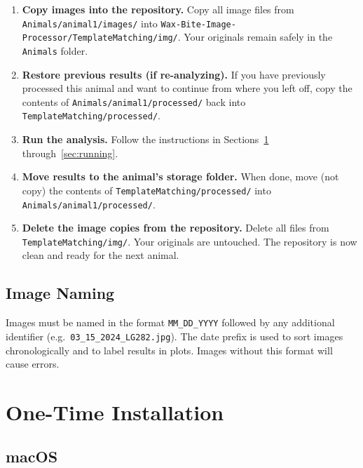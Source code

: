 \documentclass[11pt, letterpaper]{article}
\begin{document}
\begin{enumerate}[leftmargin=*, label=\textbf{\arabic*.}]
  \item \textbf{Copy images into the repository.}
    Copy all image files from \texttt{Animals/animal1/images/} into
    \texttt{Wax-Bite-Image-Processor/TemplateMatching/img/}.
    Your originals remain safely in the \texttt{Animals} folder.

  \item \textbf{Restore previous results (if re-analyzing).}
    If you have previously processed this animal and want to continue from where you left
    off, copy the contents of \texttt{Animals/animal1/processed/} back into
    \texttt{TemplateMatching/processed/}.

  \item \textbf{Run the analysis.}
    Follow the instructions in Sections~\ref{sec:installation} through~\ref{sec:running}.

  \item \textbf{Move results to the animal's storage folder.}
    When done, move (not copy) the contents of \texttt{TemplateMatching/processed/} into
    \texttt{Animals/animal1/processed/}.

  \item \textbf{Delete the image copies from the repository.}
    Delete all files from \texttt{TemplateMatching/img/}. Your originals are untouched.
    The repository is now clean and ready for the next animal.
\end{enumerate}

\subsection*{Image Naming}

Images must be named in the format \texttt{MM\_DD\_YYYY} followed by any additional
identifier (e.g.\ \texttt{03\_15\_2024\_LG282.jpg}). The date prefix is used to sort
images chronologically and to label results in plots. Images without this format will
cause errors.

\section{One-Time Installation}
\label{sec:installation}

\subsection*{macOS}
\end{document}
